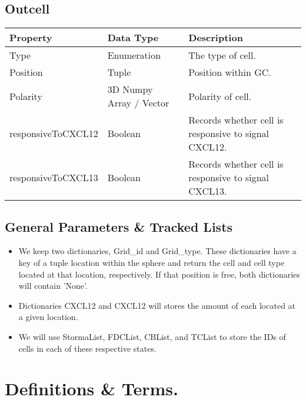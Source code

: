 \documentclass[english]{article}
\begin{document}
\subsection{Outcell}
\begin{center}
\begin{tabular}{|C{2.1in}|C{2.1in}|C{2.1in}|}
\hline
\textbf{Property} & \textbf{Data Type} & \textbf{Description}
\tabularnewline
\hline
\hline
Type & Enumeration & The type of cell. 
\tabularnewline
\hline
Position & Tuple & Position within GC.
\tabularnewline
\hline
Polarity & 3D Numpy Array / Vector & Polarity of cell.
\tabularnewline
\hline
responsiveToCXCL12 & Boolean & Records whether cell is responsive to signal CXCL12.
\tabularnewline
\hline
responsiveToCXCL13 & Boolean & Records whether cell is responsive to signal CXCL13.
\tabularnewline
\hline

\end{tabular}
\end{center}


\subsection{General Parameters \& Tracked Lists}
\begin{itemize}

\item We keep two dictionaries, Grid\_id and Grid\_type. These dictionaries have a key of a tuple location within the sphere and return the cell and cell type located at that location, respectively. If that position is free, both dictionaries will contain 'None'.

\item Dictionaries CXCL12 and CXCL12 will stores the amount of each located at a given location. 

\item We will use StormaList, FDCList, CBList, and TCList to store the IDs of cells in each of these respective states. 

\end{itemize}

\section{Definitions \& Terms.}
\end{document}

